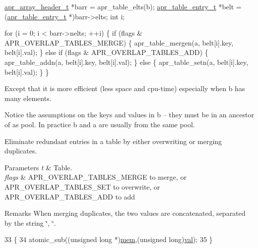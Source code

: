 \begin{DoxyPre}
 \hyperlink{structapr__array__header__t}{apr\_array\_header\_t} *barr = apr\_table\_elts(b);
 \hyperlink{structapr__table__entry__t}{apr\_table\_entry\_t} *belt = (\hyperlink{structapr__table__entry__t}{apr\_table\_entry\_t} *)barr->elts;
 int i;\end{DoxyPre}



\begin{DoxyPre} for (i = 0; i < barr->nelts; ++i) \{
     if (flags \& APR\_OVERLAP\_TABLES\_MERGE) \{
         apr\_table\_mergen(a, belt[i].key, belt[i].val);
     \}
     else if (flags \& APR\_OVERLAP\_TABLES\_ADD) \{
         apr\_table\_addn(a, belt[i].key, belt[i].val);
     \}
     else \{
         apr\_table\_setn(a, belt[i].key, belt[i].val);
     \}
 \}
\end{DoxyPre}


Except that it is more efficient (less space and cpu-\/time) especially when b has many elements.

Notice the assumptions on the keys and values in b -- they must be in an ancestor of a\textquotesingle{}s pool. In practice b and a are usually from the same pool.

Eliminate redundant entries in a table by either overwriting or merging duplicates.


\begin{DoxyParams}{Parameters}
{\em t} & Table. \\
\hline
{\em flags} & A\+P\+R\+\_\+\+O\+V\+E\+R\+L\+A\+P\+\_\+\+T\+A\+B\+L\+E\+S\+\_\+\+M\+E\+R\+GE to merge, or A\+P\+R\+\_\+\+O\+V\+E\+R\+L\+A\+P\+\_\+\+T\+A\+B\+L\+E\+S\+\_\+\+S\+ET to overwrite, or A\+P\+R\+\_\+\+O\+V\+E\+R\+L\+A\+P\+\_\+\+T\+A\+B\+L\+E\+S\+\_\+\+A\+DD to add \\
\hline
\end{DoxyParams}
\begin{DoxyRemark}{Remarks}
When merging duplicates, the two values are concatenated, separated by the string \char`\"{}, \char`\"{}. 
\end{DoxyRemark}

\begin{DoxyCode}
33 \{
34     atomic\_sub((\textcolor{keywordtype}{unsigned} \textcolor{keywordtype}{long} *)\hyperlink{group__MOD__DAV_gac8d0feaae3f1c6b0eac72aaa9af557c1}{mem},(\textcolor{keywordtype}{unsigned} \textcolor{keywordtype}{long})\hyperlink{group__APACHE__CORE__CONFIG_gae553dcb033cb5c1e269683855e4f676a}{val});
35 \}
\end{DoxyCode}
